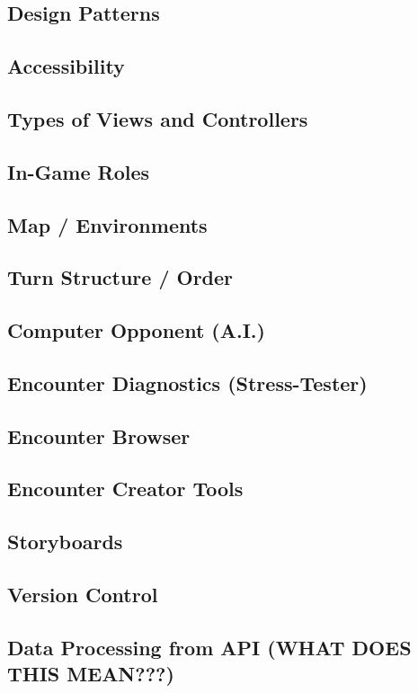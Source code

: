 \documentclass[12pt,a4paper]{report}
\begin{document}
		\subsection{Design Patterns}
		\subsection{Accessibility}
		\subsection{Types of Views and Controllers}
		\subsection{In-Game Roles}
		\subsection{Map / Environments}
		\subsection{Turn Structure / Order}
		\subsection{Computer Opponent (A.I.)}
		\subsection{Encounter Diagnostics (Stress-Tester)}
		\subsection{Encounter Browser}
		\subsection{Encounter Creator Tools}
		\subsection{Storyboards}
		\subsection{Version Control}
		\subsection{Data Processing from API (WHAT DOES THIS MEAN???)}
		
\end{document}
